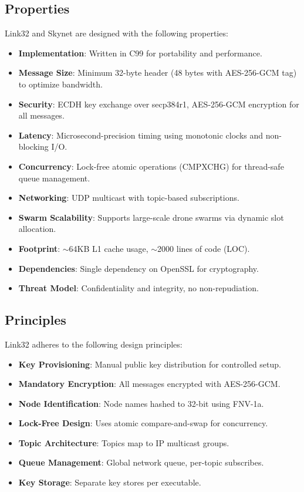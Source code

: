 \documentclass{article}
\begin{document}
\subsection{Properties}
Link32 and Skynet are designed with the following properties:
\begin{itemize}
    \item \textbf{Implementation}: Written in C99 for portability and performance.
    \item \textbf{Message Size}: Minimum 32-byte header (48 bytes with AES-256-GCM tag) to optimize bandwidth.
    \item \textbf{Security}: ECDH key exchange over secp384r1, AES-256-GCM encryption for all messages.
    \item \textbf{Latency}: Microsecond-precision timing using monotonic clocks and non-blocking I/O.
    \item \textbf{Concurrency}: Lock-free atomic operations (CMPXCHG) for thread-safe queue management.
    \item \textbf{Networking}: UDP multicast with topic-based subscriptions.
    \item \textbf{Swarm Scalability}: Supports large-scale drone swarms via dynamic slot allocation.
    \item \textbf{Footprint}: $\sim$64KB L1 cache usage, $\sim$2000 lines of code (LOC).
    \item \textbf{Dependencies}: Single dependency on OpenSSL for cryptography.
    \item \textbf{Threat Model}: Confidentiality and integrity, no non-repudiation.
\end{itemize}

\newpage
\subsection{Principles}
Link32 adheres to the following design principles:
\begin{itemize}
    \item \textbf{Key Provisioning}: Manual public key distribution for controlled setup.
    \item \textbf{Mandatory Encryption}: All messages encrypted with AES-256-GCM.
    \item \textbf{Node Identification}: Node names hashed to 32-bit using FNV-1a.
    \item \textbf{Lock-Free Design}: Uses atomic compare-and-swap for concurrency.
    \item \textbf{Topic Architecture}: Topics map to IP multicast groups.
    \item \textbf{Queue Management}: Global network queue, per-topic subscribes.
    \item \textbf{Key Storage}: Separate key stores per executable.
\end{itemize}
\end{document}
